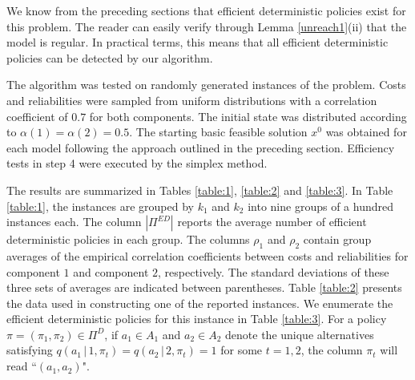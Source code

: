 \documentclass{article}
\theoremstyle{definition}
\newcounter{step}[algorithm]
\numberwithin{equation}{section}
\begin{document}
We know from the preceding sections that efficient deterministic policies exist for this problem. The reader can easily verify through Lemma \ref{unreach1}(ii) that the model is regular. In practical terms, this means that all efficient deterministic policies can be detected by our algorithm.

The algorithm was tested on randomly generated instances of the problem. Costs and reliabilities were sampled from uniform distributions with a correlation coefficient of $0.7$ for both components. The initial state was distributed according to $\alpha(1) = \alpha(2) = 0.5$. The starting basic feasible solution $x^0$ was obtained for each model following the approach outlined in the preceding section. Efficiency tests in step 4 were executed by the simplex method. 

The results are summarized in Tables \ref{table:1}, \ref{table:2} and \ref{table:3}. In Table \ref{table:1}, the instances are grouped by $k_1$ and $k_2$ into nine groups of a hundred instances each. The column $|\Pi^{ED}|$ reports the average number of efficient deterministic policies in each group. The columns $\rho_1$ and $\rho_2$ contain group averages of the empirical correlation coefficients between costs and reliabilities for component $1$ and component $2$, respectively. The standard deviations of these three sets of averages are indicated between parentheses. Table \ref{table:2} presents the data used in constructing one of the reported instances. We enumerate the efficient deterministic policies for this instance in Table \ref{table:3}. For a policy $\pi = (\pi_1, \pi_2) \in \Pi^{D}$, if $a_1 \in A_1$ and $a_2 \in A_2$ denote the unique alternatives satisfying $q(a_1 \,|\, 1, \pi_t) = q(a_2 \,|\, 2, \pi_t) = 1$ for some $t = 1, 2$, the column $\pi_t$ will read ``$(a_1, a_2)$". %
\end{document}
